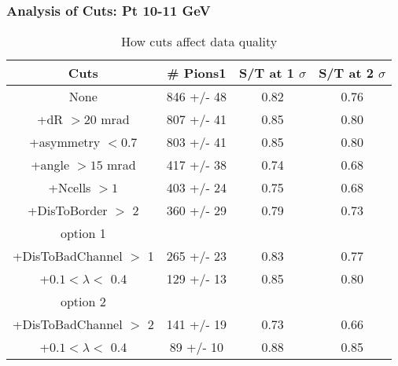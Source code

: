 \frame
{
\frametitle{Analysis of Cuts: Pt 10-11 GeV}
\begin{table}
\caption{How cuts affect data quality}
\centering
\begin{tabular}{c c c c}
\hline\hline
Cuts & \# Pions1 & S/T at 1 $\sigma$ & S/T at 2 $\sigma$ \\ [0.5ex]
\hline
None &  846 +/-   48 & 0.82 & 0.76 \\ %
+dR $> 20$ mrad &  807 +/-   41 & 0.85 & 0.80 \\ %
+asymmetry $< 0.7$ &  803 +/-   41 & 0.85 & 0.80 \\ %
+angle $> 15$ mrad &  417 +/-   38 & 0.74 & 0.68 \\ %
+Ncells $> 1$&  403 +/-   24 & 0.75 & 0.68 \\ %
+DisToBorder $>$ 2 &  360 +/-   29 & 0.79 & 0.73 \\ %
option 1\\
+DisToBadChannel $>$ 1&  265 +/-   23 & 0.83 & 0.77 \\ %
+$0.1 < \lambda <$ 0.4 &  129 +/-   13 & 0.85 & 0.80 \\ %
option 2\\
+DisToBadChannel $>$ 2&  141 +/-   19 & 0.73 & 0.66 \\ %
+$0.1 < \lambda <$ 0.4 &   89 +/-   10 & 0.88 & 0.85 \\ %
[1ex]
\hline
\end{tabular}
\label{table:nonlin}
\end{table}
}
